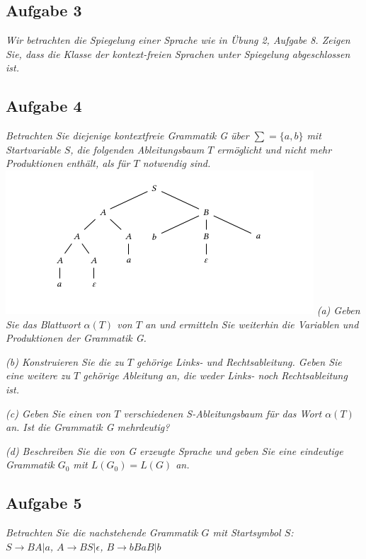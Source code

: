 \documentclass[a4paper]{article}
\begin{document}
\subsection{Aufgabe 3}
\textit{Wir betrachten die Spiegelung einer Sprache wie in Übung 2, Aufgabe 8. Zeigen Sie, dass die Klasse der kontext-freien Sprachen unter Spiegelung abgeschlossen ist.}



\subsection{Aufgabe 4}
\textit{Betrachten Sie diejenige kontextfreie Grammatik G über $\sum = \{a, b\}$ mit Startvariable $S$, die folgenden Ableitungsbaum $T$ ermöglicht und nicht mehr Produktionen enthält, als für $T$ notwendig sind.}
\includegraphics{Assets/ASK_uebung/u06_01.png}
\textit{(a) Geben Sie das Blattwort $\alpha(T)$ von $T$ an und ermitteln Sie weiterhin die Variablen und Produktionen der Grammatik G.}


\textit{(b) Konstruieren Sie die zu $T$ gehörige Links- und Rechtsableitung. Geben Sie eine weitere zu $T$ gehörige Ableitung an, die weder Links- noch Rechtsableitung ist.}


\textit{(c) Geben Sie einen von $T$ verschiedenen S-Ableitungsbaum für das Wort $\alpha(T)$ an. Ist die Grammatik G mehrdeutig?}


\textit{(d) Beschreiben Sie die von G erzeugte Sprache und geben Sie eine eindeutige Grammatik $G_0$ mit $L(G_0) = L(G)$ an.}

\subsection{Aufgabe 5}
\textit{Betrachten Sie die nachstehende Grammatik $G$ mit Startsymbol $S$:\\
$S\rightarrow BA | a$, $A\rightarrow BS | \epsilon$, $B\rightarrow bBaB | b$}
\end{document}
